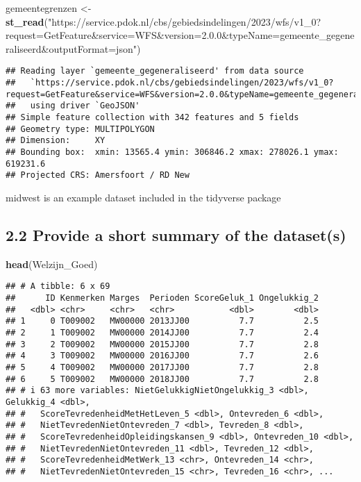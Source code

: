 \documentclass[
]{article}
\newenvironment{Shaded}{\begin{snugshade}}{\end{snugshade}}
\newcommand{\FunctionTok}[1]{\textcolor[rgb]{0.13,0.29,0.53}{\textbf{#1}}}
\newcommand{\NormalTok}[1]{#1}
\newcommand{\OtherTok}[1]{\textcolor[rgb]{0.56,0.35,0.01}{#1}}
\newcommand{\StringTok}[1]{\textcolor[rgb]{0.31,0.60,0.02}{#1}}
\begin{document}
\begin{Shaded}
\begin{Highlighting}[]
\NormalTok{gemeentegrenzen }\OtherTok{\textless{}{-}} \FunctionTok{st\_read}\NormalTok{(}\StringTok{"https://service.pdok.nl/cbs/gebiedsindelingen/2023/wfs/v1\_0?request=GetFeature\&service=WFS\&version=2.0.0\&typeName=gemeente\_gegeneraliseerd\&outputFormat=json"}\NormalTok{)}
\end{Highlighting}
\end{Shaded}

\begin{verbatim}
## Reading layer `gemeente_gegeneraliseerd' from data source 
##   `https://service.pdok.nl/cbs/gebiedsindelingen/2023/wfs/v1_0?request=GetFeature&service=WFS&version=2.0.0&typeName=gemeente_gegeneraliseerd&outputFormat=json' 
##   using driver `GeoJSON'
## Simple feature collection with 342 features and 5 fields
## Geometry type: MULTIPOLYGON
## Dimension:     XY
## Bounding box:  xmin: 13565.4 ymin: 306846.2 xmax: 278026.1 ymax: 619231.6
## Projected CRS: Amersfoort / RD New
\end{verbatim}

midwest is an example dataset included in the tidyverse package

\subsection{2.2 Provide a short summary of the
dataset(s)}\label{provide-a-short-summary-of-the-datasets}

\begin{Shaded}
\begin{Highlighting}[]
\FunctionTok{head}\NormalTok{(Welzijn\_Goed)}
\end{Highlighting}
\end{Shaded}

\begin{verbatim}
## # A tibble: 6 x 69
##      ID Kenmerken Marges  Perioden ScoreGeluk_1 Ongelukkig_2
##   <dbl> <chr>     <chr>   <chr>           <dbl>        <dbl>
## 1     0 T009002   MW00000 2013JJ00          7.7          2.5
## 2     1 T009002   MW00000 2014JJ00          7.7          2.4
## 3     2 T009002   MW00000 2015JJ00          7.7          2.8
## 4     3 T009002   MW00000 2016JJ00          7.7          2.6
## 5     4 T009002   MW00000 2017JJ00          7.7          2.8
## 6     5 T009002   MW00000 2018JJ00          7.7          2.8
## # i 63 more variables: NietGelukkigNietOngelukkig_3 <dbl>, Gelukkig_4 <dbl>,
## #   ScoreTevredenheidMetHetLeven_5 <dbl>, Ontevreden_6 <dbl>,
## #   NietTevredenNietOntevreden_7 <dbl>, Tevreden_8 <dbl>,
## #   ScoreTevredenheidOpleidingskansen_9 <dbl>, Ontevreden_10 <dbl>,
## #   NietTevredenNietOntevreden_11 <dbl>, Tevreden_12 <dbl>,
## #   ScoreTevredenheidMetWerk_13 <chr>, Ontevreden_14 <chr>,
## #   NietTevredenNietOntevreden_15 <chr>, Tevreden_16 <chr>, ...
\end{verbatim}
\end{document}
